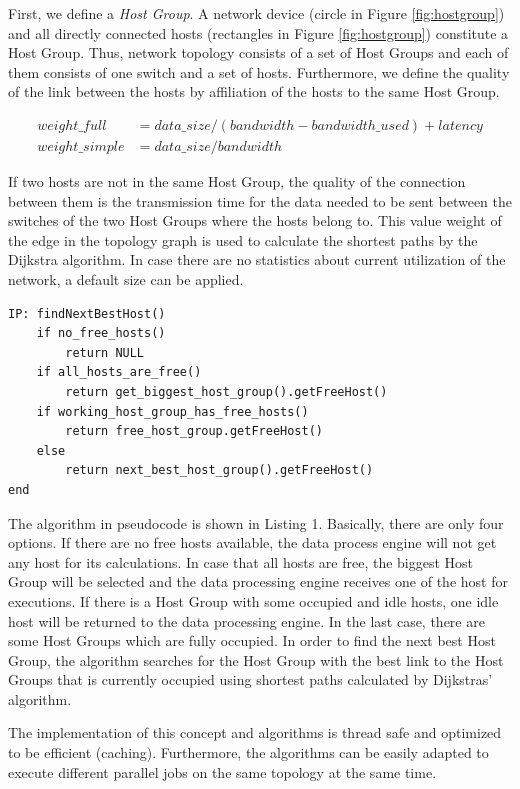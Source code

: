 First, we define a \textit{Host Group}. A network device (circle in Figure \ref{fig:hostgroup}) and all
directly connected hosts (rectangles in Figure \ref{fig:hostgroup}) constitute a Host Group.
Thus, network topology consists of a set of Host Groups and each of them consists of one switch and
a set of hosts. Furthermore, we define the quality of the link between the hosts by affiliation of
the hosts to the same Host Group.

\begin{align}
    weight\_full& = data\_size / (bandwidth - bandwidth\_used) + latency \\
    weight\_simple& = data\_size / bandwidth
\end{align}

If two hosts are not in the same Host Group, the quality of the connection between them is the
transmission time for the data needed to be sent between the switches of the two Host Groups where
the hosts belong to. This value weight of the edge in the topology graph is used to calculate the
shortest paths by the Dijkstra algorithm. In case there are no statistics about current utilization
of the network, a default size can be applied.\\

\begin{lstlisting}[caption=Algorithm of finding free hosts based on Host Group concept]
IP: findNextBestHost()
    if no_free_hosts()
        return NULL
    if all_hosts_are_free()
        return get_biggest_host_group().getFreeHost()
    if working_host_group_has_free_hosts()
        return free_host_group.getFreeHost()
    else
        return next_best_host_group().getFreeHost()
end
\end{lstlisting}

The algorithm in pseudocode is shown in Listing 1. Basically, there are only four options. If
there are no free hosts available, the data process engine will not get any host for its
calculations. In case that all hosts are free, the biggest Host Group will be selected and the data
processing engine receives one of the host for executions. If there is a Host Group with some
occupied and idle hosts, one idle host will be returned to the data processing engine. In the last
case, there are some Host Groups which are fully occupied. In order to find the next best Host
Group, the algorithm searches for the Host Group with the best link to the Host Groups that is
currently occupied using shortest paths calculated by Dijkstras' algorithm.

The implementation of this concept and algorithms is thread safe and optimized to be efficient
(caching). Furthermore, the algorithms can be easily adapted to execute different parallel jobs on
the same topology at the same time.


